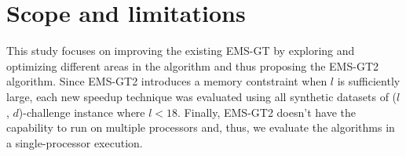\section{Scope and limitations}

This study focuses on improving the existing EMS-GT by exploring and optimizing different areas in the algorithm and thus proposing the EMS-GT2 algorithm. Since EMS-GT2 introduces a memory contstraint when $l$ is sufficiently large, each new speedup technique was evaluated using all synthetic datasets of ($l$, $d$)-challenge instance where $l < 18$. Finally, EMS-GT2 doesn't have the capability to run on multiple processors and, thus, we evaluate the algorithms in a single-processor execution.